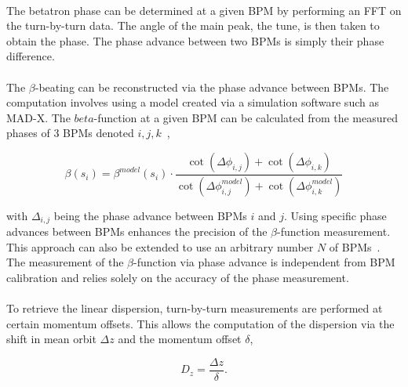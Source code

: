 \FloatBarrier

\paragraph{}
The betatron phase can be determined at a given BPM by performing an FFT on the turn-by-turn
data. The angle of the main peak, the tune, is then taken to obtain the phase. The phase advance
between two BPMs is simply their phase difference.


\paragraph{} 
The $\beta$-beating can be reconstructed via the phase advance between BPMs. The computation
involves using a model created via a simulation software such as MAD-X. The $beta$-function at a
given BPM can be calculated from the measured phases of 3 BPMs denoted $i, j,
k$~\cite{minty_measurement_2003},

\begin{equation}
    \beta(s_i) = \beta^{model}(s_i) \cdot \frac{\cot(\Delta\phi_{i,j}) + \cot(\Delta\phi_{i,k})}{\cot\left(\Delta\phi_{i,j}^{model}\right) + \cot\left(\Delta\phi_{i, k}^{model}\right)}
\end{equation}

with $\Delta_{i,j}$ being the phase advance between BPMs $i$ and $j$. Using specific phase advances
between BPMs enhances the precision of the $\beta$-function measurement. This approach can also be
extended to use an arbitrary number $N$ of
BPMs~\cite{langner_utilizing_2016,wegscheider_analytical_2017}. The measurement of the
$\beta$-function via phase advance is independent from BPM calibration and relies solely on the
accuracy of the phase measurement.


\paragraph{} To retrieve the linear dispersion, turn-by-turn measurements are
performed at certain momentum offsets. This allows the computation of the dispersion via the shift
in mean orbit $\Delta z$ and the momentum offset $\delta$,

\begin{equation}
    D_z = \frac{\Delta z}{\delta}.
\end{equation}

